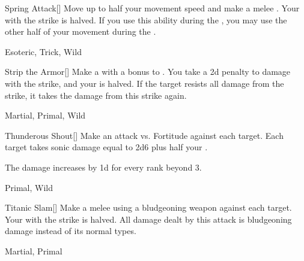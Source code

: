 \lowercase{\hypertarget{maneuver:Spring Attack}{}}\label{maneuver:Spring Attack}
\hypertarget{maneuver:Spring Attack}{}
\begin{freeability}[Rank 3]{Spring Attack}[]
Move up to half your movement speed and make a melee .
Your  with the strike is halved.
If you use this ability during the , you may use the other half of your movement during the .


 Esoteric, Trick, Wild
\end{freeability}
\vspace{0.25em}



\lowercase{\hypertarget{maneuver:Strip the Armor}{}}\label{maneuver:Strip the Armor}
\hypertarget{maneuver:Strip the Armor}{}
\begin{freeability}[Rank 3]{Strip the Armor}[]
Make a  with a  bonus to .
You take a \minus2d penalty to damage with the strike, and your  is halved.
If the target resists all damage from the strike, it takes the damage from this strike again.


 Martial, Primal, Wild
\end{freeability}
\vspace{0.25em}



\lowercase{\hypertarget{maneuver:Thunderous Shout}{}}\label{maneuver:Thunderous Shout}
\hypertarget{maneuver:Thunderous Shout}{}
\begin{freeability}[Rank 3]{Thunderous Shout}[]
Make an attack vs. Fortitude against each target.
\hit Each target takes sonic damage equal to 2d6 plus half your .

\rankline
The damage increases by \plus1d for every rank beyond 3.


 Primal, Wild
\end{freeability}
\vspace{0.25em}



\lowercase{\hypertarget{maneuver:Titanic Slam}{}}\label{maneuver:Titanic Slam}
\hypertarget{maneuver:Titanic Slam}{}
\begin{freeability}[Rank 3]{Titanic Slam}[]
Make a melee  using a bludgeoning weapon against each target.
Your  with the strike is halved.
All damage dealt by this attack is bludgeoning damage instead of its normal types.


 Martial, Primal
\end{freeability}
\vspace{0.25em}



